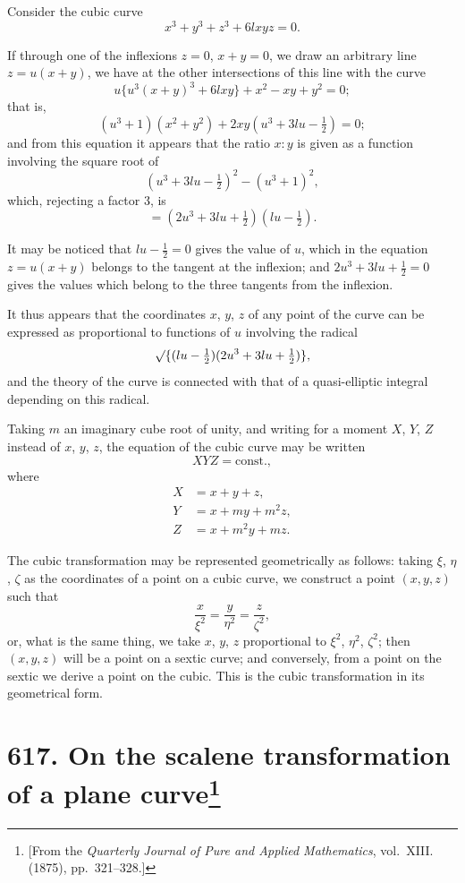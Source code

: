 \documentclass[11pt,a4paper]{article}
\theoremstyle{plain}
\theoremstyle{definition}
\theoremstyle{remark}
\begin{document}
Consider the cubic curve
\[
x^3 + y^3 + z^3 + 6lxyz = 0.
\]

If through one of the inflexions $z = 0$, $x + y = 0$, we draw an arbitrary line $z = u(x+y)$, we have at the other intersections of this line with the curve
\[
u\{u^3(x+y)^3 + 6lxy\} + x^2 - xy + y^2 = 0;
\]
that is,
\[
(u^3+1)(x^2+y^2) + 2xy(u^3 + 3lu - \tfrac{1}{2}) = 0;
\]
and from this equation it appears that the ratio $x:y$ is given as a function involving the square root of
\[
(u^3 + 3lu - \tfrac{1}{2})^2 - (u^3+1)^2,
\]
which, rejecting a factor 3, is
\[
= (2u^3 + 3lu + \tfrac{1}{2})(lu - \tfrac{1}{2}).
\]

It may be noticed that $lu - \tfrac{1}{2} = 0$ gives the value of $u$, which in the equation $z = u(x+y)$ belongs to the tangent at the inflexion; and $2u^3 + 3lu + \tfrac{1}{2} = 0$ gives the values which belong to the three tangents from the inflexion.

It thus appears that the coordinates $x$, $y$, $z$ of any point of the curve can be expressed as proportional to functions of $u$ involving the radical
\[
\surd\{(lu - \tfrac{1}{2})(2u^3 + 3lu + \tfrac{1}{2})\},
\]
and the theory of the curve is connected with that of a quasi-elliptic integral depending on this radical.

Taking $m$ an imaginary cube root of unity, and writing for a moment $X$, $Y$, $Z$ instead of $x$, $y$, $z$, the equation of the cubic curve may be written
\[
XYZ = \text{const.},
\]
where
\begin{align*}
X &= x + y + z,\\
Y &= x + my + m^2z,\\
Z &= x + m^2y + mz.
\end{align*}

The cubic transformation may be represented geometrically as follows: taking $\xi$, $\eta$, $\zeta$ as the coordinates of a point on a cubic curve, we construct a point $(x, y, z)$ such that
\[
\frac{x}{\xi^2} = \frac{y}{\eta^2} = \frac{z}{\zeta^2},
\]
or, what is the same thing, we take $x$, $y$, $z$ proportional to $\xi^2$, $\eta^2$, $\zeta^2$; then $(x, y, z)$ will be a point on a sextic curve; and conversely, from a point on the sextic we derive a point on the cubic. This is the cubic transformation in its geometrical form.

\newpage
\section[On the scalene transformation of a plane curve]{\textbf{617.} On the scalene transformation of a plane curve\footnote{[From the \textit{Quarterly Journal of Pure and Applied Mathematics}, vol.~XIII. (1875), pp.~321--328.]}}
\end{document}
